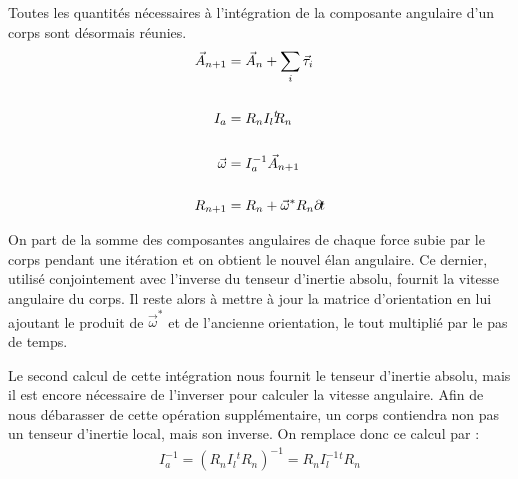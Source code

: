 Toutes les quantités nécessaires à l'intégration de la composante
angulaire d'un corps sont désormais réunies.
\begin{align*}
  \vec{A}_{n+1} &= \vec{A}_n + \sum_i \vec{\tau}_i \\ \\
  I_a &= R_n I_l {}^t\!\!R_n \\ \\
  \vec{\omega} &= I^{-1}_a \vec{A}_{n+1} \\ \\
  R_{n+1} &= R_n + \vec{\omega}^* R_n \partial \! t
\end{align*}

On part de la somme des composantes angulaires de chaque force subie
par le corps pendant une itération et on obtient le nouvel élan
angulaire. Ce dernier, utilisé conjointement avec l'inverse du tenseur
d'inertie absolu, fournit la vitesse angulaire du corps. Il reste
alors à mettre à jour la matrice d'orientation en lui ajoutant le
produit de $\vec{\omega}^*$ et de l'ancienne orientation, le tout
multiplié par le pas de temps.

Le second calcul de cette intégration nous fournit le tenseur
d'inertie absolu, mais il est encore nécessaire de l'inverser pour
calculer la vitesse angulaire. Afin de nous débarasser de cette
opération supplémentaire, un corps contiendra non pas un tenseur
d'inertie local, mais son inverse. On remplace donc ce calcul par :
\begin{align*}
  I^{-1}_a = (R_n I_l {}^t\!\!R_n)^{-1} = R_n I^{-1}_l {}^t\!\!R_n
\end{align*}
